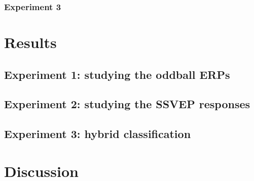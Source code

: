 \documentclass[10pt]{article}
\begin{document}



        \subsubsection{Experiment 3}
        \label{sec:2.3.3AnalysisExp3}
        
        
        
        

\section{Results}
\label{sec:3Results}

    \subsection{Experiment 1: studying the oddball \acsp{ERP}}
    \label{sec:3.1Oddball}


    \subsection{Experiment 2: studying the \acs{SSVEP} responses}
    \label{sec:3.2SSVEP}


    \subsection{Experiment 3: hybrid classification}
    \label{sec:3.3Hybrid}


\section{Discussion}
\label{sec:4Discuss}

\end{document}
